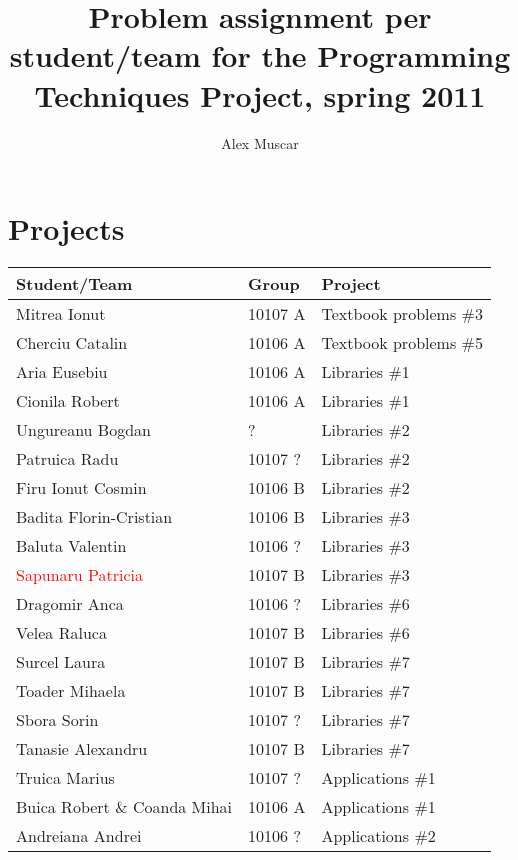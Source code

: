 \documentclass{article}
\begin{document}
\title{Problem assignment per student/team for the Programming Techniques Project, spring 2011}
\author{Alex Muscar}
\maketitle

\section{Projects}

\begin{center}
  \begin{tabular}{ | l | l | l | }
    \hline
    \textbf{Student/Team} & \textbf{Group} & \textbf{Project} \\ \hline
    Mitrea Ionut & 10107 A & Textbook problems \#3 \\ \hline
    Cherciu Catalin & 10106 A & Textbook problems \#5 \\ \hline
    Aria Eusebiu & 10106 A & Libraries \#1 \\ \hline
    Cionila Robert & 10106 A & Libraries \#1 \\ \hline
    Ungureanu Bogdan & ? & Libraries \#2 \\ \hline
    Patruica Radu & 10107 ? & Libraries \#2 \\ \hline
    Firu Ionut Cosmin & 10106 B & Libraries \#2 \\ \hline
    Badita Florin-Cristian & 10106 B & Libraries \#3 \\ \hline
    Baluta Valentin & 10106 ? & Libraries \#3 \\ \hline
    \textcolor{red}{Sapunaru Patricia} & 10107 B & Libraries \#3 \\ \hline
    Dragomir Anca & 10106 ? & Libraries \#6 \\ \hline
    Velea Raluca & 10107 B & Libraries \#6 \\ \hline
    Surcel Laura & 10107 B & Libraries \#7 \\ \hline
    Toader Mihaela & 10107 B & Libraries \#7 \\ \hline
    Sbora Sorin & 10107 ? & Libraries \#7 \\ \hline
    Tanasie Alexandru & 10107 B & Libraries \#7 \\ \hline
    Truica Marius & 10107 ? & Applications \#1 \\ \hline
    Buica Robert \& Coanda Mihai & 10106 A & Applications \#1 \\ \hline
    Andreiana Andrei & 10106 ? & Applications \#2 \\ \hline

\end{tabular}
\end{center}
\end{document}

